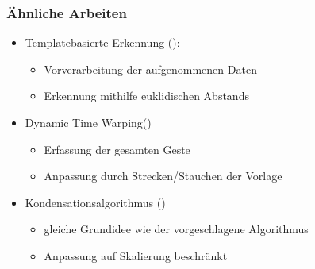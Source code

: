 \documentclass{beamer}
\begin{document}
\begin{frame}\frametitle{Ähnliche Arbeiten}
\begin{itemize}
\item Templatebasierte Erkennung (\citet{Wobbrock2007}):
\begin{itemize}
\item Vorverarbeitung der aufgenommenen Daten
\item Erkennung mithilfe euklidischen Abstands
\end{itemize}
\item Dynamic Time Warping(\citet{Gawrila1995,Liu2009})
\begin{itemize}
\item Erfassung der gesamten Geste
\item Anpassung durch Strecken/Stauchen der Vorlage
\end{itemize}
\item Kondensationsalgorithmus (\citet{BlackandJepson1998a})
\begin{itemize}
\item gleiche Grundidee wie der vorgeschlagene Algorithmus
\item Anpassung auf Skalierung beschränkt
\end{itemize}
\end{itemize}
\end{frame}
\end{document}
